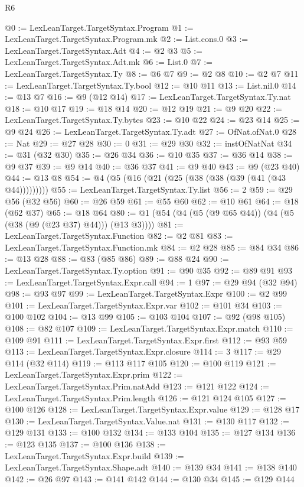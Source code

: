 \begin{lexlean}{R6}
\begin{coremodule}
@0 := LexLeanTarget.TargetSyntax.Program
@1 := LexLeanTarget.TargetSyntax.Program.mk
@2 := List.cons.{0}
@3 := LexLeanTarget.TargetSyntax.Adt
@4 := @2 @3
@5 := LexLeanTarget.TargetSyntax.Adt.mk
@6 := List.{0}
@7 := LexLeanTarget.TargetSyntax.Ty
@8 := @6 @7
@9 := @2 @8
@10 := @2 @7
@11 := LexLeanTarget.TargetSyntax.Ty.bool
@12 := @10 @11
@13 := List.nil.{0}
@14 := @13 @7
@16 := @9 (@12 @14)
@17 := LexLeanTarget.TargetSyntax.Ty.nat
@18 := @10 @17
@19 := @18 @14
@20 := @12 @19
@21 := @9 @20
@22 := LexLeanTarget.TargetSyntax.Ty.bytes
@23 := @10 @22
@24 := @23 @14
@25 := @9 @24
@26 := LexLeanTarget.TargetSyntax.Ty.adt
@27 := OfNat.ofNat.{0}
@28 := Nat
@29 := @27 @28
@30 := 0
@31 := @29 @30
@32 := instOfNatNat
@34 := @31 (@32 @30)
@35 := @26 @34
@36 := @10 @35
@37 := @36 @14
@38 := @9 @37
@39 := @9 @14
@40 := @36 @37
@41 := @9 @40
@43 := @9 (@23 @40)
@44 := @13 @8
@54 := @4 (@5 (@16 (@21 (@25 (@38 (@38 (@39 (@41 (@43 @44)))))))))
@55 := LexLeanTarget.TargetSyntax.Ty.list
@56 := 2
@59 := @29 @56 (@32 @56)
@60 := @26 @59
@61 := @55 @60
@62 := @10 @61
@64 := @18 (@62 @37)
@65 := @18 @64
@80 := @1 (@54 (@4 (@5 (@9 @65 @44)) (@4 (@5 (@38 (@9 (@23 @37) @44))) (@13 @3))))
@81 := LexLeanTarget.TargetSyntax.Function
@82 := @2 @81
@83 := LexLeanTarget.TargetSyntax.Function.mk
@84 := @2 @28
@85 := @84 @34
@86 := @13 @28
@88 := @83 (@85 @86)
@89 := @88 @24
@90 := LexLeanTarget.TargetSyntax.Ty.option
@91 := @90 @35
@92 := @89 @91
@93 := LexLeanTarget.TargetSyntax.Expr.call
@94 := 1
@97 := @29 @94 (@32 @94)
@98 := @93 @97
@99 := LexLeanTarget.TargetSyntax.Expr
@100 := @2 @99
@101 := LexLeanTarget.TargetSyntax.Expr.var
@102 := @101 @34
@103 := @100 @102
@104 := @13 @99
@105 := @103 @104
@107 := @92 (@98 @105)
@108 := @82 @107
@109 := LexLeanTarget.TargetSyntax.Expr.match
@110 := @109 @91
@111 := LexLeanTarget.TargetSyntax.Expr.first
@112 := @93 @59
@113 := LexLeanTarget.TargetSyntax.Expr.closure
@114 := 3
@117 := @29 @114 (@32 @114)
@119 := @113 @117 @105
@120 := @100 @119
@121 := LexLeanTarget.TargetSyntax.Expr.prim
@122 := LexLeanTarget.TargetSyntax.Prim.natAdd
@123 := @121 @122
@124 := LexLeanTarget.TargetSyntax.Prim.length
@126 := @121 @124 @105
@127 := @100 @126
@128 := LexLeanTarget.TargetSyntax.Expr.value
@129 := @128 @17
@130 := LexLeanTarget.TargetSyntax.Value.nat
@131 := @130 @117
@132 := @129 @131
@133 := @100 @132
@134 := @133 @104
@135 := @127 @134
@136 := @123 @135
@137 := @100 @136
@138 := LexLeanTarget.TargetSyntax.Expr.build
@139 := LexLeanTarget.TargetSyntax.Shape.adt
@140 := @139 @34
@141 := @138 @140
@142 := @26 @97
@143 := @141 @142
@144 := @130 @34
@145 := @129 @144

\end{coremodule}
\end{lexlean}
